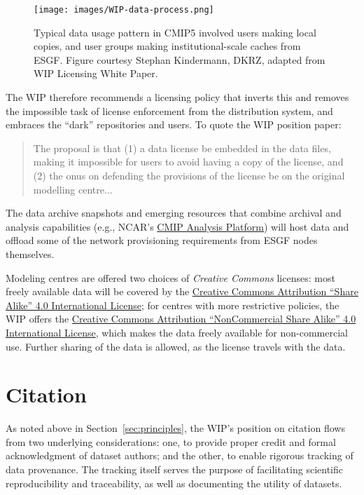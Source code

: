 \documentclass[gmd,manuscript]{copernicus}
\newcommand{\secref}[1] {\mbox{Section  \ref{sec:#1}}}
\begin{document}
\begin{figure*}
  \begin{center}
    \texttt{[image: images/WIP-data-process.png]}
  \end{center}
  \caption{Typical data usage pattern in CMIP5 involved users making
    local copies, and user groups making institutional-scale caches
    from ESGF. Figure courtesy Stephan Kindermann, DKRZ, adapted from
    WIP Licensing White Paper.}
  \label{fig:dark}
\end{figure*}

The WIP therefore recommends a licensing policy that inverts this and
removes the impossible task of license enforcement from the
distribution system, and embraces the ``dark'' repositories and users.
To quote the WIP position paper:

\begin{quote}
  The proposal is that (1) a data license be embedded in the data
  files, making it impossible for users to avoid having a copy of the
  license, and (2) the onus on defending the provisions of the license
  be on the original modelling centre...
\end{quote}

The data archive snapshots and emerging resources that combine
archival and analysis capabilities (e.g., NCAR's
\href{https://goo.gl/sYTxC2}{CMIP Analysis Platform}) will host data
and offload some of the network provisioning requirements from ESGF
nodes themselves.

Modeling centres are offered two choices of \emph{Creative Commons
}licenses: most freely available data will be covered by the
\href{https://goo.gl/CY5m2v}{Creative Commons Attribution ``Share
  Alike'' 4.0 International License}; for centres with more
restrictive policies, the WIP offers the
\href{https://goo.gl/KUNUKq}{Creative Commons Attribution
  ``NonCommercial Share Alike'' 4.0 International License}, which
makes the data freely available for non-commercial use. Further
sharing of the data is allowed, as the license travels with the data.

\section{Citation}
\label{sec:cite}

As noted above in \secref{principles}, the WIP's position on citation
flows from two underlying considerations: one, to provide proper
credit and formal acknowledgment of dataset authors; and the other, to
enable rigorous tracking of data provenance. The tracking itself
serves the purpose of facilitating scientific reproducibility and
traceability, as well as documenting the utility of datasets.
\end{document}
